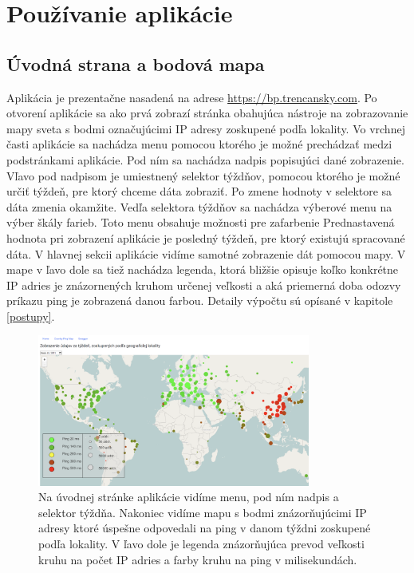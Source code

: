 \chapter{Používanie aplikácie}

\label{kap:pouzivanie}

\section{Úvodná strana a bodová mapa}

Aplikácia je prezentačne nasadená na adrese \href{https://bp.trencansky.com/}{https://bp.trencansky.com}. Po otvorení aplikácie sa ako prvá zobrazí stránka obahujúca nástroje na 
zobrazovanie mapy sveta s bodmi označujúcimi IP adresy zoskupené podľa lokality. Vo vrchnej časti aplikácie sa nachádza menu pomocou 
ktorého je možné prechádzať medzi podstránkami aplikácie. Pod ním sa nachádza nadpis popisujúci dané zobrazenie. Vľavo pod nadpisom je umiestnený 
selektor týždňov, pomocou ktorého je možné určiť týždeň, pre ktorý chceme dáta zobraziť. Po zmene hodnoty v selektore sa dáta zmenia okamžite. 
Vedľa selektora týždňov sa nachádza výberové menu na výber škály farieb. Toto menu obsahuje možnosti pre zafarbenie 
Prednastavená hodnota pri zobrazení aplikácie je posledný týždeň, pre ktorý existujú spracované dáta. V hlavnej sekcii aplikácie vidíme samotné 
zobrazenie dát pomocou mapy. V mape v ľavo dole sa tiež nachádza legenda, ktorá bližšie opisuje koľko konkrétne IP adries je znázornených kruhom 
určenej veľkosti a aká priemerná doba odozvy príkazu ping je zobrazená danou farbou. Detaily výpočtu sú opísané v kapitole \ref{postupy}. 

\begin{figure}
    \centerline{\includegraphics[width=0.8\textwidth]{images/map-points}}
    \caption[Úvodná strana s mapou]{Na úvodnej stránke aplikácie vidíme menu, pod ním nadpis a selektor týždňa. Nakoniec vidíme mapu s bodmi 
    znázorňujúcimi IP adresy ktoré úspešne odpovedali na ping v danom týždni zoskupené podľa lokality. V ľavo dole je legenda znázorňujúca prevod veľkosti
    kruhu na počet IP adries a farby kruhu na ping v milisekundách.}
    \label{obr:map-points}
\end{figure}


